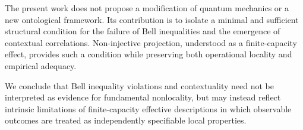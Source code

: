   The present work does not propose a modification of quantum mechanics or a new
  ontological framework.
  Its contribution is to isolate a minimal and sufficient structural condition for the
  failure of Bell inequalities and the emergence of contextual correlations.
  Non-injective projection, understood as a finite-capacity effect, provides such a
  condition while preserving both operational locality and empirical adequacy.

  We conclude that Bell inequality violations and contextuality need not be interpreted
  as evidence for fundamental nonlocality, but may instead reflect intrinsic limitations
  of finite-capacity effective descriptions in which observable outcomes are treated as
  independently specifiable local properties.
